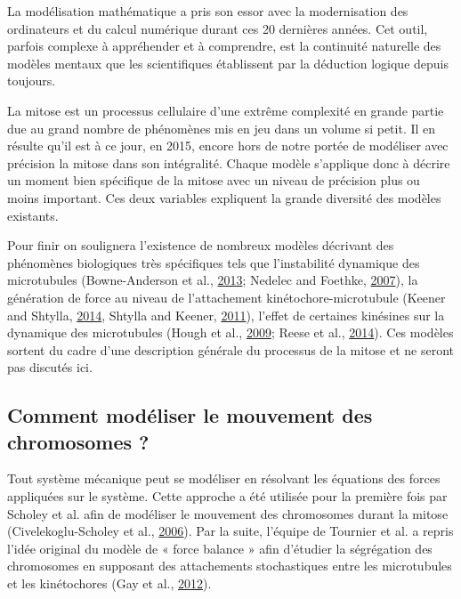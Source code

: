 \documentclass[12pt,a4paper,twoside,openright]{book}
\begin{document}
La modélisation mathématique a pris son essor avec la modernisation des
ordinateurs et du calcul numérique durant ces 20 dernières années. Cet
outil, parfois complexe à appréhender et à comprendre, est la continuité
naturelle des modèles mentaux que les scientifiques établissent par la
déduction logique depuis toujours.

La mitose est un processus cellulaire d'une extrême complexité en grande
partie due au grand nombre de phénomènes mis en jeu dans un volume si
petit. Il en résulte qu'il est à ce jour, en 2015, encore hors de notre
portée de modéliser avec précision la mitose dans son intégralité.
Chaque modèle s'applique donc à décrire un moment bien spécifique de la
mitose avec un niveau de précision plus ou moins important. Ces deux
variables expliquent la grande diversité des modèles existants.

Pour finir on soulignera l'existence de nombreux modèles décrivant des
phénomènes biologiques très spécifiques tels que l'instabilité dynamique
des microtubules (Bowne-Anderson et al.,
\hyperref[ref-Bowne-Anderson2013]{2013}; Nedelec and Foethke,
\hyperref[ref-Nedelec2007]{2007}), la génération de force au niveau de
l'attachement kinétochore-microtubule (Keener and Shtylla,
\hyperref[ref-Keener2014]{2014}, Shtylla and Keener,
\hyperref[ref-Shtylla2011]{2011}), l'effet de certaines kinésines sur la
dynamique des microtubules (Hough et al.,
\hyperref[ref-Hough2009]{2009}; Reese et al.,
\hyperref[ref-Reese2014a]{2014}). Ces modèles sortent du cadre d'une
description générale du processus de la mitose et ne seront pas discutés
ici.

\subsection{Comment modéliser le mouvement des chromosomes
?}\label{comment-moduxe9liser-le-mouvement-des-chromosomes}

Tout système mécanique peut se modéliser en résolvant les équations des
forces appliquées sur le système. Cette approche a été utilisée pour la
première fois par Scholey et al. afin de modéliser le mouvement des
chromosomes durant la mitose (Civelekoglu-Scholey et al.,
\hyperref[ref-Civelekoglu-Scholey2006]{2006}). Par la suite, l'équipe de
Tournier et al. a repris l'idée original du modèle de « force balance »
afin d'étudier la ségrégation des chromosomes en supposant des
attachements stochastiques entre les microtubules et les kinétochores
(Gay et al., \hyperref[ref-Gay2012a]{2012}).
\end{document}
